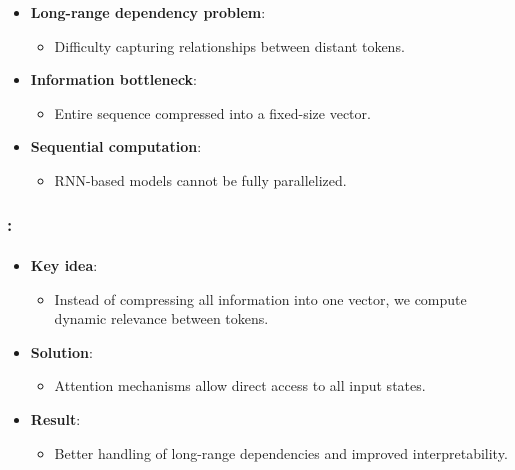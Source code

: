 \documentclass[xcolor=table]{beamer}
\begin{document}
	\begin{subsectionframe}
		\begin{itemize}
			
			\item \textbf{Long-range dependency problem}:
			\begin{itemize}
				\item Difficulty capturing relationships between distant tokens.
			\end{itemize}
			
			\item \textbf{Information bottleneck}:
			\begin{itemize}
				\item Entire sequence compressed into a fixed-size vector.
			\end{itemize}
			
			\item \textbf{Sequential computation}:
			\begin{itemize}
				\item RNN-based models cannot be fully parallelized.
			\end{itemize}
			
		\end{itemize}
	\end{subsectionframe}
	
	\begin{frame}
		\frametitle{\insertshortsubtitle: \insertsection}
		\framesubtitle{\insertsubsection}
		
		\begin{itemize}
			\item \textbf{Key idea}:
			\begin{itemize}
				\item Instead of compressing all information into one vector, we compute dynamic relevance between tokens.
			\end{itemize}
			
			\item \textbf{Solution}:
			\begin{itemize}
				\item Attention mechanisms allow direct access to all input states.
			\end{itemize}
			
			\item \textbf{Result}:
			\begin{itemize}
				\item Better handling of long-range dependencies and improved interpretability.
			\end{itemize}
		\end{itemize}
		
	\end{frame}
	
\end{document}
